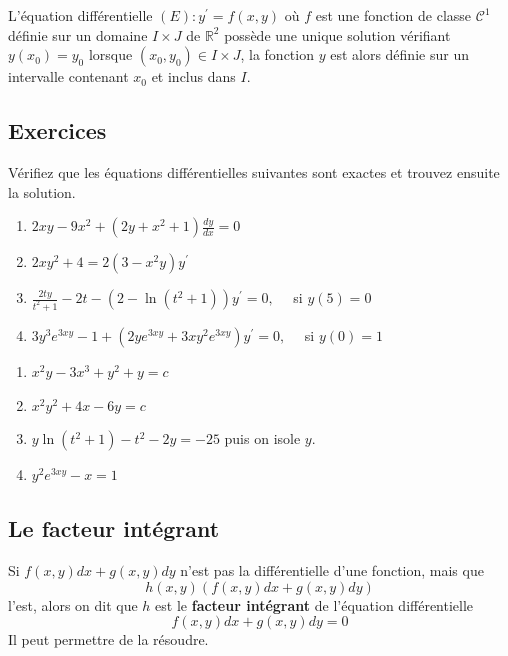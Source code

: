 \documentclass[12pt]{article}
\newcounter{theoreme}
\newcounter{exercice}
\begin{document}
\begin{theoreme}[title=Théorème de Cauchy (admis)]
L'équation différentielle $(E): y^{\prime}=f(x, y)$ où $f$ est une fonction de classe $\mathcal{C}^{1}$ définie sur un domaine $I \times J$ de $\mathbb{R}^{2}$ possède une unique solution vérifiant $y\left(x_{0}\right)=y_{0}$ lorsque $\left(x_{0}, y_{0}\right) \in I \times J$, la fonction $y$ est alors définie sur un intervalle contenant $x_{0}$ et inclus dans $I$.
\end{theoreme}

\subsection{Exercices}

\begin{exercice}
Vérifiez que les équations différentielles suivantes sont exactes et trouvez ensuite la solution.
\begin{enumerate}
  \item $2 x y-9 x^{2}+\left(2 y+x^{2}+1\right) \frac{dy}{dx}=0$
  \item $2 x y^{2}+4=2\left(3-x^{2} y\right) y^{\prime}$
  \item $\frac{2 t y}{t^{2}+1}-2 t-\left(2-\ln \left(t^{2}+1\right)\right) y^{\prime}=0, \quad$ si $y(5)=0$
  \item $3 y^{3} e^{3 x y}-1+\left(2 y e^{3 x y}+3 x y^{2} e^{3 x y}\right) y^{\prime}=0, \quad$ si $y(0)=1$
\end{enumerate}
\end{exercice}

\begin{corrige}
\begin{enumerate}
  \item $x^{2} y-3 x^{3}+y^{2}+y=c$
  \item $x^{2} y^{2}+4 x-6 y=c$
  \item $y \ln \left(t^{2}+1\right)-t^{2}-2 y=-25$ puis on isole $y$.
  \item $y^{2} e^{3 x y}-x=1$
\end{enumerate}
\end{corrige}

\subsection{Le facteur intégrant}

Si $f(x, y) dx + g(x, y) dy$ n'est pas la différentielle d'une fonction, mais que
$$
h(x, y)(f(x, y) dx + g(x, y) dy)
$$
l'est, alors on dit que $h$ est le \textbf{facteur intégrant} de l'équation différentielle
$$
f(x, y) dx + g(x, y) dy = 0
$$
Il peut permettre de la résoudre.
\end{document}
